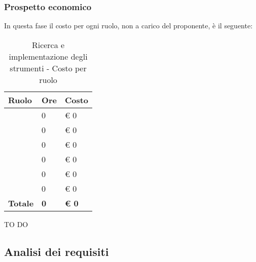		\subsubsection{Prospetto economico} %
		\label{ssub:prospetto_economico}
		In questa fase il costo per ogni ruolo, non a carico del proponente, è il seguente: \\
			\begin{table}[!h]
				\begin{center}
					\begin{tabularx}{0.6\textwidth}{|l|l|X|}
						\hline
						\textbf{Ruolo} & \textbf{Ore} & \textbf{Costo} \\
						\hline
						\roleProjectManager & 0 & \euro{} 0 \\
						\hline
						\roleAnalyst & 0 & \euro{} 0 \\
						\hline
						\roleDesigner & 0 & \euro{} 0 \\
						\hline
						\roleAdministrator & 0 & \euro{} 0 \\
						\hline
						\roleProgrammer & 0 & \euro{} 0 \\
						\hline
						\roleVerifier & 0 & \euro{} 0 \\
						\hline
						\textbf{Totale} & \textbf{0} & \textbf{\euro{} 0} \\
						\hline
					\end{tabularx}
				\end{center}
			\caption{Ricerca e implementazione degli strumenti - Costo per ruolo}
			\end{table}

		\noindent
		TO DO
		
	
	
	\subsection{Analisi dei requisiti} %
	\label{sub:analisi_dei_requisiti}
